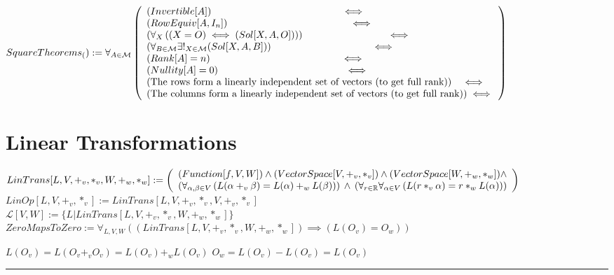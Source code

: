 \documentclass{book}
\newcommand{\abr}{:=}
\newcommand{\pr}[1]{\left(#1\right)}
\begin{document}
$SquareTheorems_() \abr \forall_{A \in \mathcal{M}}\left(\begin{array}{ll}
  (Invertible[A]) \hfill \iff \hfill \\
  (RowEquiv[A, I_n]) \hfill \iff \hfill \\
  \pr{\forall_{X}\pr{(X = O) \iff (Sol[X, A, O])}} \hfill \iff \hfill \\
  \pr{\forall_{B \in \mathcal{M}} \exists!_{X \in \mathcal{M}}(Sol[X, A, B])} \hfill \iff \hfill \\
  (Rank[A] = n) \hfill \iff \hfill \\
  (Nullity[A] = 0) \hfill \iff \hfill \\
  \pr{\text{The rows form a linearly independent set of vectors (to get full rank)}} \hfill \iff \hfill \\
  \pr{\text{The columns form a linearly independent set of vectors (to get full rank)}} \hfill \iff \hfill \\
\end{array}\right)$ \\

\section{Linear Transformations}
$LinTrans[L, V, +_v, *_v, W, +_w, *_w] \abr \left(\begin{array}{ll}
  (Function[f, V, W]) \hfill \land \hfill (VectorSpace[V, +_v, *_v]) \hfill \land \hfill (VectorSpace[W, +_w, *_w]) \hfill \land \hfill \\
  \pr{\forall_{\alpha, \beta \in V}\pr{L(\alpha +_v \beta) = L(\alpha) +_w L(\beta)}} \hfill \land \hfill \pr{\forall_{r \in \mathbb{R}} \forall_{\alpha \in V}\pr{L(r *_v \alpha) = r *_w L(\alpha)}}
\end{array}\right)$ \\
$LinOp[L, V, +_v, *_v] \abr LinTrans[L, V, +_v, *_v, V, +_v, *_v]$ \\
$\mathcal{L}[V, W] \abr \{L | LinTrans[L, V, +_v, *_v, W, +_w, *_w]\}$ \\

$ZeroMapsToZero \abr \forall_{L, V, W}\pr{(LinTrans[L, V, +_v, *_v, W, +_w, *_w]) \implies \pr{L(O_v) = O_w}}$
\begin{enumerate}
  \lit $L(O_v) = L(O_v +_v O_v) = L(O_v) +_w L(O_v)$
  \lit $O_w = L(O_v) - L(O_v) = L(O_v)$
\end{enumerate} \vspace{.75mm} \hrule \vspace{.75mm} \ \\ 
\end{document}
